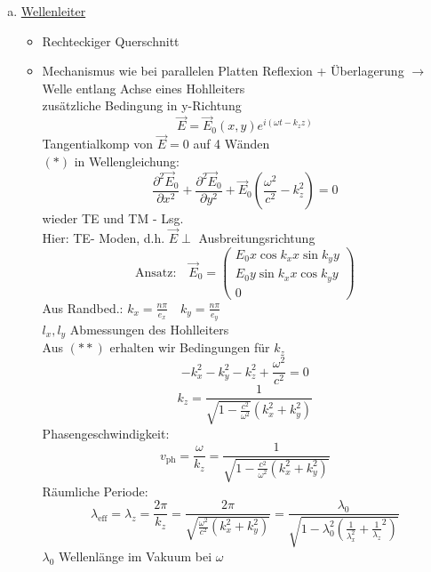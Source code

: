 \documentclass[titlepage,12pt,a4paper,ngerman]{report}
\newcommand{\tx}[1]{\textrm{#1}}
\newcommand{\folie}[1]{\color{gray}[Folie: #1]\color{black}}
\begin{document}
\begin{enumerate}[a)]
	$$k_z = \sqrt{\frac{\omega^2}{c^2} - \frac{n^2 \pi^2}{d^2}}$$
	\folie{Phasen- und Gruppengeschwindigkeit zwischen parallelen Grenzflächen}
	\item \underline{Wellenleiter}
	\begin{itemize}
		\item Rechteckiger Querschnitt
		\item Mechanismus wie bei parallelen Platten Reflexion + Überlagerung $ \rightarrow $ Welle entlang Achse eines Hohlleiters\\
		zusätzliche Bedingung in y-Richtung
		\begin{equation*} 
		\vec{E} = \vec{E}_0(x,y) e^{i(\omega t - k_z z)} \tag{$ * $}
		\end{equation*}
		Tangentialkomp von $ \vec{E} = 0 $ auf 4 Wänden\\
		$ (*) $ in Wellengleichung:
		\begin{equation*}
		\frac{\partial^2 \vec{E}_0}{\partial x^2} + \frac{\partial ^2 \vec{E}_0}{\partial y^2} + \vec{E}_0 (\frac{\omega^2}{c^2} - k_z^2) = 0 \tag{$ ** $}
		\end{equation*}
		wieder TE und TM - Lsg.\\
		Hier: TE- Moden, d.h. $ \vec{E} \perp $ Ausbreitungsrichtung
		\begin{equation*}
		\tx{Ansatz:} \quad \vec{E}_0 = \begin{pmatrix}
		E_0 x \cos k_x x \sin k_y y \\
		E_0 y \sin k_x x \cos k_y y \\
		0
		\end{pmatrix}
		\end{equation*}
		Aus Randbed.: $ k_x = \frac{n \pi }{e_x} \quad k_y = \frac{n \pi}{e_y} $\\
		$ l_x,l_y $ Abmessungen des Hohlleiters\\
		Aus $ (**) $ erhalten wir Bedingungen für $ k_z $
		$$-k_x^2 - k_y^2 - k_z^2 + \frac{\omega^2}{c^2} = 0$$
		$$k_z = \frac{1}{\sqrt{1 - \frac{c^2}{\omega^2}} (k_x^2 + k_y^2)}$$
		Phasengeschwindigkeit:
		$$v_{\tx{ph}} = \frac{\omega}{k_z} = \frac{1}{\sqrt{1 - \frac{c^2}{\omega^2} (k_x^2 + k_y^2)}}$$
		Räumliche Periode:
		\begin{equation*}
		\lambda_{\tx{eff}} = \lambda_z = \frac{2 \pi}{k_z} = \frac{2 \pi }{\sqrt{\frac{\omega^2}{c^2} (k_x^2 + k_y^2)}} = \frac{\lambda_0}{\sqrt{1 - \lambda_0^2 (\frac{1}{\lambda_x^2} + \frac{1}{\lambda_z}^2)}}
		\end{equation*}
		$ \lambda_0 $ Wellenlänge im Vakuum bei $ \omega $ \\

\end{itemize}
\end{enumerate}
\end{document}
